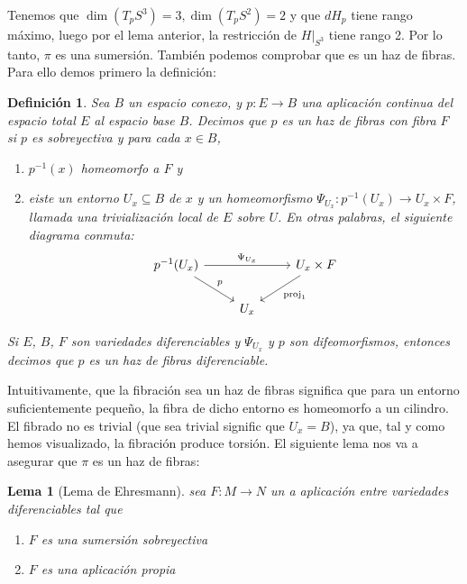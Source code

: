 \documentclass[11pt]{diazessay} %
\newtheorem{definition}{Definición}
\newtheorem{lemma}{Lema}
\begin{document}
Tenemos que $\dim(T_pS^3)=3, \dim(T_pS^2)=2$ y que $dH_p$ tiene rango máximo, luego por el lema anterior, la restricción de $H|_{S^3}$ tiene rango 2. Por lo tanto, $\pi$ es una sumersión. También podemos comprobar que es un haz de fibras. Para ello demos primero la definición:

\begin{definition}
    Sea $B$ un espacio conexo, y $p:E\to B$ una aplicación continua del \textit{espacio total} $E$ al \textit{espacio base} $B$. Decimos que $p$ es un haz de fibras con fibra $F$ si $p$ es sobreyectiva y para cada $x\in B$,
    \begin{enumerate}
        \item $p^{-1}(x)$ homeomorfo a $F$ y
        \item eiste un entorno $U_x\subseteq B$ de $x$ y un homeomorfismo $\Psi_{U_x}:p^{-1}(U_x)\to U_x\times F$, llamada una trivialización local de $E$ sobre $U$. En otras palabras, el siguiente diagrama conmuta:
              \[
                  \begin{tikzcd}
                      p^{-1}(U_x) \arrow[rr, "\Psi_{U_x}"] \arrow[rd, "p"] & & U_x\times F \arrow[ld, "\textrm{proj}_1"] \\
                      & U_x &
                  \end{tikzcd}
              \]
    \end{enumerate}

    Si $E$, $B$, $F$ son variedades diferenciables y $\Psi_{U_x}$ y $p$ son difeomorfismos, entonces decimos que $p$ es un haz de fibras diferenciable.
\end{definition}

Intuitivamente, que la fibración sea un haz de fibras significa que para un entorno suficientemente pequeño, la fibra de dicho entorno es homeomorfo a un cilindro. El fibrado no es trivial (que sea trivial signific que $U_x=B$), ya que, tal y como hemos visualizado, la fibración produce torsión. El siguiente lema nos va a asegurar que $\pi$ es un haz de fibras:

\begin{lemma}[Lema de Ehresmann]
    sea $F:M\to N$ un a aplicación entre variedades diferenciables tal que
    \begin{enumerate}
        \item $F$ es una sumersión sobreyectiva
        \item $F$ es una aplicación propia
    \end{enumerate}
\end{lemma}
\end{document}
